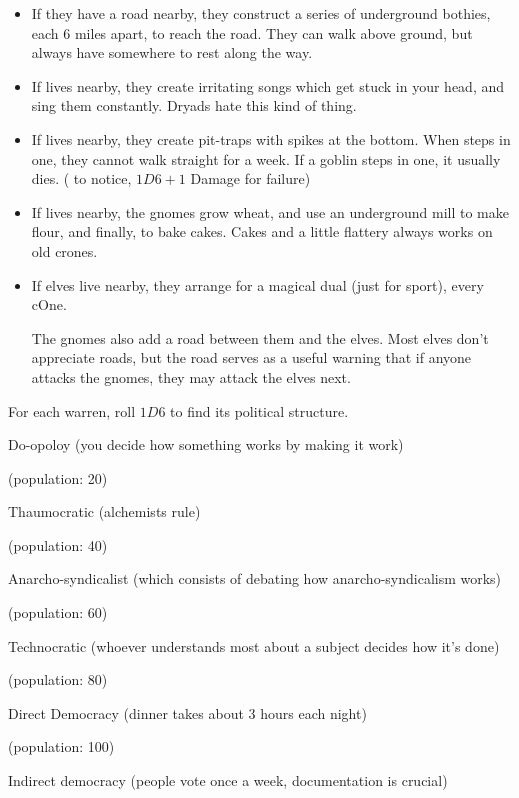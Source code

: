 \begin{multicols}{2}
\begin{itemize}
  \item
  If they have a road nearby, they construct a series of underground bothies, each 6 miles apart, to reach the road.
  They can walk above ground, but always have somewhere to rest along the way.
  \item
  If  lives nearby, they create irritating songs which get stuck in your head, and sing them constantly.  Dryads hate this kind of thing.
  \item
  If  lives nearby, they create pit-traps with spikes at the bottom.
  When  steps in one, they cannot walk straight for a week.
  If a goblin steps in one, it usually dies.
  ( \tn[12] to notice, $1D6+1$ Damage for failure)
  \item
  If  lives nearby, the gnomes grow wheat, and use an underground mill to make flour, and finally, to bake cakes.  Cakes and a little flattery always works on old crones.
  \item
  If elves live nearby, they arrange for a magical dual (just for sport), every \gls{cOne}.

  The gnomes also add a road between them and the elves.
  Most elves don't appreciate roads, but the road serves as a useful warning that if anyone attacks the gnomes, they may attack the elves next.
\end{itemize}

For each warren, roll $1D6$ to find its political structure.

\begin{dlist}
  \item
  Do-opoloy (you decide how something works by making it work)

  (population: 20)
  \item
  Thaumocratic (alchemists rule)

  (population: 40)
  \item
  Anarcho-syndicalist (which consists of debating how anarcho-syndicalism works)

  (population: 60)
  \item
  Technocratic (whoever understands most about a subject decides how it's done)

  (population: 80)
  \item
  Direct Democracy (dinner takes about 3 hours each night)

  (population: 100)
  \item
  Indirect democracy (people vote once a week, documentation is crucial)


\end{dlist}
\end{multicols}
